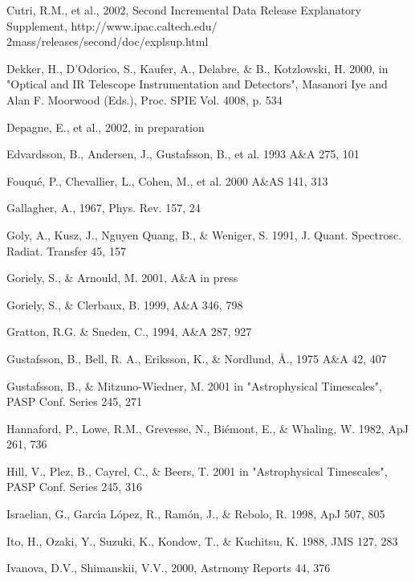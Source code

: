 \documentclass{aa}
\begin{document}
\begin{thebibliography}{}
    Cutri, R.M., et al., 2002,  Second Incremental Data 
    Release Explanatory Supplement, 
    http://www.ipac.caltech.edu/
    2mass/releases/second/doc/explsup.html

     Dekker, H., D'Odorico, S., Kaufer, A., Delabre, 
\& B., Kotzlowski, H. 2000, in "Optical and IR 
   Telescope Instrumentation and Detectors", Masanori Iye and Alan F. 
   Moorwood (Eds.), Proc. SPIE Vol. 4008, p. 534 

    Depagne, E., et al., 2002, in preparation

    Edvardsson, B., Andersen, J., Gustafsson, B.,
et al. 1993 A\&A 275, 101

    Fouqu\'e, P., Chevallier, L., Cohen, M., et
 al. 2000 A\&AS 141, 313 

    Gallagher, A., 1967, Phys. Rev. 157, 24

    Goly, A., Kusz, J., Nguyen Quang, B., \&
   Weniger, S. 1991, J. Quant. Spectrosc. Radiat. Transfer 45, 157

     Goriely, S., \& Arnould, M. 2001, A\&A in press

    Goriely, S., \& Clerbaux, B. 1999, A\&A 346, 798

    Gratton, R.G. \& Sneden, C., 1994, A\&A 287, 927

    Gustafsson, B., Bell, R. A., Eriksson, K.,
\& Nordlund, \AA., 1975 A\&A 42, 407

    Gustafsson, B., \& Mitzuno-Wiedner,
M. 2001 in "Astrophysical Timescales", PASP Conf. Series 245, 271

     Hannaford, P., Lowe, R.M., Grevesse,
    N., Bi\'emont, E., \& Whaling, W. 1982, ApJ 261, 736

    Hill, V., Plez, B., Cayrel, C., \& Beers, T.
   2001 in "Astrophysical Timescales", PASP Conf. Series 245, 316

    Israelian, G., Garc\'{\i}a L\'opez, R.,
   Ram\'on, J., \& Rebolo, R. 1998, ApJ 507, 805

    Ito, H., Ozaki, Y., Suzuki, K., Kondow, T., 
\& Kuchitsu, K. 1988, JMS 127, 283

    Ivanova, D.V., Shimanskii, V.V., 2000,
   Astrnomy Reports 44, 376 


\end{thebibliography}
\end{document}

